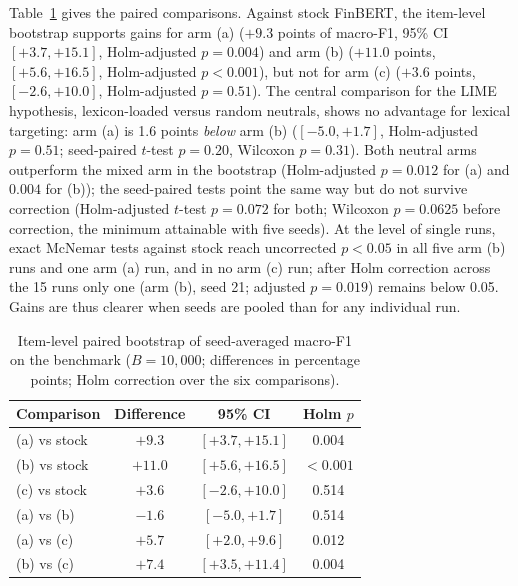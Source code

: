 \documentclass{aims}
\numberwithin{equation}{section}
\begin{document}
Table~\ref{tab:boot} gives the paired comparisons. Against stock FinBERT, the
item-level bootstrap supports gains for arm (a) ($+9.3$ points of macro-F1, 95\% CI
$[+3.7, +15.1]$, Holm-adjusted $p = 0.004$) and arm (b) ($+11.0$ points,
$[+5.6, +16.5]$, Holm-adjusted $p < 0.001$), but not for arm (c) ($+3.6$ points,
$[-2.6, +10.0]$, Holm-adjusted $p = 0.51$). The central comparison for the LIME
hypothesis, lexicon-loaded versus random neutrals, shows no advantage for lexical
targeting: arm (a) is 1.6 points \emph{below} arm (b) ($[-5.0, +1.7]$,
Holm-adjusted $p = 0.51$; seed-paired $t$-test $p = 0.20$, Wilcoxon $p = 0.31$). Both
neutral arms outperform the mixed arm in the bootstrap (Holm-adjusted $p = 0.012$
for (a) and $0.004$ for (b)); the seed-paired tests point the same way but do not
survive correction (Holm-adjusted $t$-test $p = 0.072$ for both; Wilcoxon $p = 0.0625$
before correction, the minimum attainable with five seeds). At the level of single
runs, exact McNemar tests against stock reach uncorrected $p < 0.05$ in all five arm
(b) runs and one arm (a) run, and in no arm (c) run; after Holm correction across the
15 runs only one (arm (b), seed 21; adjusted $p = 0.019$) remains below 0.05. Gains
are thus clearer when seeds are pooled than for any individual run.

\begin{table}[ht]
\centering
\caption{Item-level paired bootstrap of seed-averaged macro-F1 on the benchmark
($B = 10{,}000$; differences in percentage points; Holm correction over the six
comparisons).}
\label{tab:boot}
\begin{tabular}{lccc}
\toprule
\textbf{Comparison} & \textbf{Difference} & \textbf{95\% CI} & \textbf{Holm $p$} \\
\midrule
(a) vs stock & $+9.3$ & $[+3.7, +15.1]$ & 0.004 \\
(b) vs stock & $+11.0$ & $[+5.6, +16.5]$ & $<0.001$ \\
(c) vs stock & $+3.6$ & $[-2.6, +10.0]$ & 0.514 \\
(a) vs (b) & $-1.6$ & $[-5.0, +1.7]$ & 0.514 \\
(a) vs (c) & $+5.7$ & $[+2.0, +9.6]$ & 0.012 \\
(b) vs (c) & $+7.4$ & $[+3.5, +11.4]$ & 0.004 \\
\bottomrule
\end{tabular}
\end{table}
\end{document}
